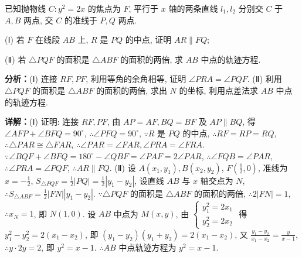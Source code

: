 \begin{question}[points=12]
已知抛物线 $C:y^2=2x$ 的焦点为 $F$, 平行于 $x$ 轴的两条直线 $l_1,l_2$ 分别交 $C$ 于 $A,B$ 两点, 交 $C$ 的准线于 $P,Q$ 两点.

(Ⅰ) 若 $F$ 在线段 $AB$ 上, $R$ 是 $PQ$ 的中点, 证明 $AR\parallel FQ$;

(Ⅱ) 若 $\triangle PQF$ 的面积是 $\triangle ABF$ 的面积的两倍, 求 $AB$ 中点的轨迹方程.
\begin{solution}

\textbf{分析：}(Ⅰ) 连接 $RF,PF$, 利用等角的余角相等, 证明 $\angle PRA=\angle PQF$. (Ⅱ) 利用 $\triangle PQF$ 的面积是 $\triangle ABF$ 的面积的两倍, 求出 $N$ 的坐标, 利用点差法求 $AB$ 中点的轨迹方程.

\textbf{详解：}(Ⅰ) 证明: 连接 $RF,PF$, 由 $AP=AF,BQ=BF$ 及 $AP\parallel BQ$, 得 $\angle AFP+\angle BFQ=90^\circ$, $\therefore\angle PFQ=90^\circ$, $\because R$ 是 $PQ$ 的中点, $\therefore RF=RP=RQ$, $\therefore\triangle PAR\cong\triangle FAR$, $\therefore\angle PAR=\angle FAR,\angle PRA=\angle FRA$. $\because\angle BQF+\angle BFQ=180^\circ-\angle QBF=\angle PAF=2\angle PAR$, $\therefore\angle FQB=\angle PAR$, $\therefore\angle PRA=\angle PQF$, $\therefore AR\parallel FQ$.
(Ⅱ) 设 $A(x_1,y_1),B(x_2,y_2)$, $F(\frac{1}{2},0)$, 准线为 $x=-\frac{1}{2}$, $S_{\triangle PQF}=\frac{1}{2}|PQ|=\frac{1}{2}|y_1-y_2|$, 设直线 $AB$ 与 $x$ 轴交点为 $N$, $\therefore S_{\triangle ABF}=\frac{1}{2}|FN||y_1-y_2|$. $\because\triangle PQF$ 的面积是 $\triangle ABF$ 的面积的两倍, $\therefore 2|FN|=1$, $\therefore x_N=1$, 即 $N(1,0)$. 设 $AB$ 中点为 $M(x,y)$, 由 $\begin{cases}y_1^2=2x_1\\y_2^2=2x_2\end{cases}$ 得 $y_1^2-y_2^2=2(x_1-x_2)$, 即 $(y_1-y_2)(y_1+y_2)=2(x_1-x_2)$, 又 $\frac{y_1-y_2}{x_1-x_2}=\frac{y}{x-1}$, $\therefore y\cdot2y=2$, 即 $y^2=x-1$. $\therefore AB$ 中点轨迹方程为 $y^2=x-1$.
\end{solution}
\end{question}

